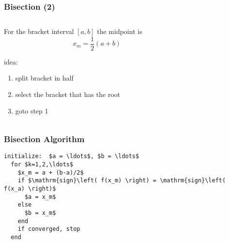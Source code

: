\documentclass[10pt]{beamer}
\begin{document}
\begin{frame}
\frametitle{Bisection (2)}

\begin{columns}
  \begin{column}{0.48\textwidth}
For the bracket interval $[a,b]$ the midpoint is
\begin{equation*}
    x_m = \frac{1}{2}(a+b)
\end{equation*}

idea:
\begin{enumerate}
\item split bracket in half
\item select the bracket that has the root
\item goto step 1
\end{enumerate}
  \end{column}
  \begin{column}{0.48\textwidth}
  \end{column}
\end{columns}



\end{frame}
\begin{frame}[fragile]
\frametitle{Bisection Algorithm}

\begin{lstlisting}[mathescape,caption=Bisection,label=algo:bisection]
  initialize:  $a = \ldots$, $b = \ldots$   
  for $k=1,2,\ldots$                        
    $x_m = a + (b-a)/2$                     
    if $\mathrm{sign}\left( f(x_m) \right) = \mathrm{sign}\left( f(x_a) \right)$ 
      $a = x_m$  
    else         
      $b = x_m$  
    end          
    if converged, stop       
  end
\end{lstlisting}




\end{frame}
\end{document}
